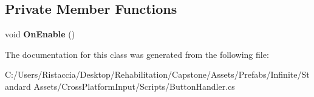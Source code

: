 \subsection*{Private Member Functions}
\begin{DoxyCompactItemize}
\item 
\mbox{\label{class_unity_standard_assets_1_1_cross_platform_input_1_1_button_handler_a64c2f1eacf18dcf3e4aad86e951a62d6}} 
void {\bfseries On\+Enable} ()
\end{DoxyCompactItemize}


The documentation for this class was generated from the following file\+:\begin{DoxyCompactItemize}
\item 
C\+:/\+Users/\+Ristaccia/\+Desktop/\+Rehabilitation/\+Capstone/\+Assets/\+Prefabs/\+Infinite/\+Standard Assets/\+Cross\+Platform\+Input/\+Scripts/Button\+Handler.\+cs\end{DoxyCompactItemize}
